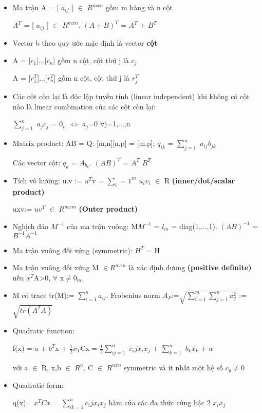 \documentclass{article}
\begin{document}
\begin{itemize}
    \item Ma trận A = [ $a_{ij}$ ] $\in$ $R^{mxn}$  gồm m hàng và n cột
    
    $A^{T}$ = [ $a_{ij}$ ]  $\in$ $R^{mxn}$. $(A+B)^T$ = $A^T$ + $B^T$
    
    \item Vector b theo quy ước mặc định là vector \textbf{cột}
    \item A = [$c_1$]...[$c_n$] gồm n cột, cột thứ j là $c_j$
    
    A = [$r_1^T$]...[$r_n^T$] gồm n cột, cột thứ j là $r_j^T$
    \item Các cột còn lại là độc lập tuyến tính (linear independent) khi không có cột nào là linear combination của các cột còn lại:
    
    $\sum_{j=1}^n$ $a_j$$c_j$ = $0_n$ $\Longleftrightarrow$ $a_j$=0 $\forall$j=1,...,n
    
    \item Matrix product: 
    AB = Q: [m,n][n,p] = [m.p]; $q_{ik}$ = $\sum_{j=1}^n$ $a_{ij}$$b_{jk}$
    
    Các vector cột: $q_k$ = $A_{b_k}$. $(AB)^T$ = $A^T$ $B^T$
    \item Tích vô hướng: u.v := $u^T$v = $\sum_i=1^m$ $u_i$$v_i$ $\in$ R \textbf{(inner/dot/scalar product)} 
    
    uxv:= ${uv}^T$ $\in$ $R^{mxm}$ \textbf{(Outer product)}
    \item Nghịch đảo $M^{-1}$ của ma trận vuông: M$M^{-1}$ = $l_m$ = diag(1,...,1). ${(AB)}^{-1}$ = $B^{-1}$$A^{-1}$
    
    \item Ma trận vuông đối xứng (symmetric): $H^T$ = H
    \item Ma trận vuông đối xứng M $\in$$R^{mxn}$ là xác định dương \textbf{(positive definite)} nếu $x^T$A>0, $\forall$ x$\neq$$0_m$.
    \item 
    M có trace tr(M):= $\sum_{i=1}^n$$a_{ij}$. 
    Frobenius norm $A_F$:=$\sqrt{\sum_{i=1}^m \sum_{j=1}^n a_y^2}$ 
    := $\sqrt{tr(A^T A)}$
    
    \item Quadratic function: 
    
    f(x) = a + $b^T$x + $\frac{1}{2}$$x_T$Cx = $\frac{1}{2}$$\sum_{i j=1}^n$ $c_ij x_i x_j$ + $\sum_{k=1}^n$ $b_k x_k$ + a
    
    với a $\in$ R, x,b $\in$ $R^n$. C $\in$ $R^{nxn}$ symmetric và ít nhất một hệ số $c_y \neq 0$
    
    \item Quadratic form:
    
    q(x)= $x^T Cx$ = $\sum_{i k=1}^n c_ij x_i x_j$ hàm của các đa thức cùng bậc 2 $x_i x_j$ 
    
\end{itemize}
\end{document}
